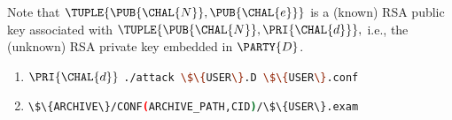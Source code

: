 
%
Note that
$
\TUPLE{ \PUB{\CHAL{N}}, \PUB{\CHAL{e}} }
$
is
a     (known) RSA public  key 
associated with 
$
\TUPLE{ \PUB{\CHAL{N}}, \PRI{\CHAL{d}} } ,
$
i.e.,
the (unknown) RSA private key embedded in $\PARTY{D}$.



\begin{enumerate}
\item \DESCTASKIMPL
      {$\PRI{\CHAL{d}}$}
      {\mbox{\lstinline[language={bash}]|./attack \$\{USER\}.D \$\{USER\}.conf|}}
\item \DESCTASKEXAM
      {\mbox{\lstinline[language={bash}]|\$\{ARCHIVE\}/CONF(ARCHIVE_PATH,CID)/\$\{USER\}.exam|}}
\end{enumerate}

